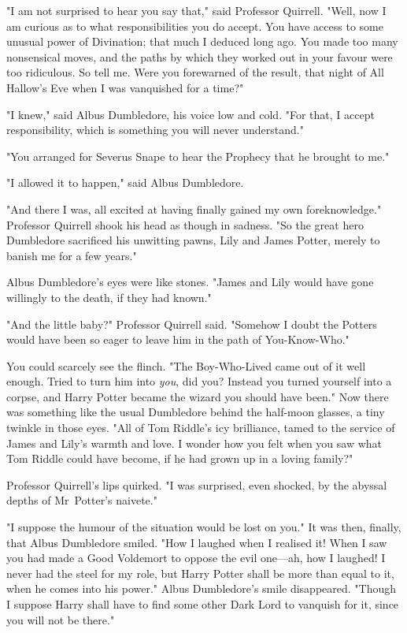"I am not surprised to hear you say that," said Professor Quirrell. "Well, now
I am curious as to what responsibilities you do accept. You have access to some
unusual power of Divination; that much I deduced long ago. You made too many
nonsensical moves, and the paths by which they worked out in your favour were
too ridiculous. So tell me. Were you forewarned of the result, that night of
All Hallow’s Eve when I was vanquished for a time?"

"I knew," said Albus Dumbledore, his voice low and cold. "For that, I accept
responsibility, which is something you will never understand."

"You arranged for Severus Snape to hear the Prophecy that he brought to me."

"I allowed it to happen," said Albus Dumbledore.

"And there I was, all excited at having finally gained my own foreknowledge."
Professor Quirrell shook his head as though in sadness. "So the great hero
Dumbledore sacrificed his unwitting pawns, Lily and James Potter, merely to
banish me for a few years."

Albus Dumbledore’s eyes were like stones. "James and Lily would have gone
willingly to the death, if they had known."

"And the little baby?" Professor Quirrell said. "Somehow I doubt the Potters
would have been so eager to leave him in the path of You-Know-Who."

You could scarcely see the flinch. "The Boy-Who-Lived came out of it well
enough. Tried to turn him into \emph{you}, did you? Instead you turned yourself
into a corpse, and Harry Potter became the wizard you should have been." Now
there was something like the usual Dumbledore behind the half-moon glasses, a
tiny twinkle in those eyes. "All of Tom Riddle’s icy brilliance, tamed to the
service of James and Lily’s warmth and love. I wonder how you felt when you saw
what Tom Riddle could have become, if he had grown up in a loving family?"

Professor Quirrell’s lips quirked. "I was surprised, even shocked, by the
abyssal depths of Mr~Potter’s naivete."

"I suppose the humour of the situation would be lost on you." It was then,
finally, that Albus Dumbledore smiled. "How I laughed when I realised it! When
I saw you had made a Good Voldemort to oppose the evil one—ah, how I laughed!
I never had the steel for my role, but Harry Potter shall be more than equal to
it, when he comes into his power." Albus Dumbledore’s smile disappeared.
"Though I suppose Harry shall have to find some other Dark Lord to vanquish for
it, since you will not be there."

